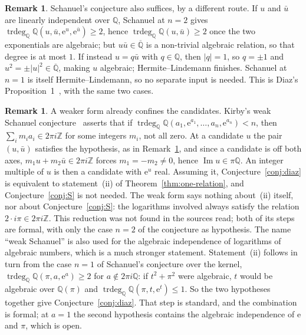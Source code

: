 \documentclass[11pt,a4paper]{article}
\theoremstyle{plain}
\theoremstyle{definition}
\newtheorem{remark}[theorem]{Remark}
\newcommand{\e}{\mathrm{e}}
\newcommand{\Q}{\mathbb{Q}}
\newcommand{\Z}{\mathbb{Z}}
\newcommand{\Alg}{\overline{\mathbb{Q}}}
\DeclareMathOperator{\trdeg}{trdeg}
\begin{document}
\begin{remark}\label{rem:schanuel}
Schanuel's conjecture also suffices, by a different route. If $u$ and $\bar u$ are linearly
independent over $\Q$, Schanuel at $n=2$ gives
$\trdeg_{\Q}\Q(u,\bar u,\e^{u},\e^{\bar u})\geq2$, hence $\trdeg_{\Q}\Q(u,\bar u)\geq2$ once
the two exponentials are algebraic; but $u\bar u\in\Alg$ is a non-trivial algebraic relation, so
that degree is at most $1$. If instead $u=q\bar u$ with $q\in\Q$, then $\lvert q\rvert=1$, so
$q=\pm1$ and $u^{2}=\pm\lvert u\rvert^{2}\in\Alg$, making $u$ algebraic; Hermite--Lindemann
finishes. Schanuel at $n=1$ is itself Hermite--Lindemann, so no separate input is needed. This is
Diaz's Proposition~1~\cite[pp.~550--551]{diaz-2004}, with the same two cases.
\end{remark}

\begin{remark}\label{rem:weak-schanuel}
A weaker form already confines the candidates. Kirby's weak Schanuel conjecture~\cite[Conjecture~1.5]{kirby-2018}
asserts that if $\trdeg_{\Q}\Q(a_{1},\e^{a_{1}},\dots,a_{n},\e^{a_{n}})<n$, then $\sum_{i}m_{i}a_{i}\in2\pi i\Z$ for
some integers $m_{i}$, not all zero. At a candidate $u$ the pair $(u,\bar u)$ satisfies the hypothesis, as in
Remark~\ref{rem:schanuel}, and since a candidate is off both axes, $m_{1}u+m_{2}\bar u\in2\pi i\Z$ forces
$m_{1}=-m_{2}\neq0$, hence $\operatorname{Im}u\in\pi\Q$. An integer multiple of $u$ is then a candidate with
$\e^{u}$ real. Assuming it, Conjecture~\ref{conj:diaz} is equivalent to statement~(ii) of
Theorem~\ref{thm:one-relation}, and Conjecture~\ref{conj:S} is not needed. The weak form says nothing about~(ii)
itself, nor about Conjecture~\ref{conj:S}: the logarithms involved always satisfy the relation
$2\cdot i\pi\in2\pi i\Z$. This reduction was not found in the sources read; both of its steps are formal, with
only the case $n=2$ of the conjecture as hypothesis. The name ``weak Schanuel'' is also used
for the algebraic independence of logarithms of algebraic numbers, which is a much stronger statement.
Statement~(ii) follows in turn from the case $n=1$ of Schanuel's conjecture over the kernel,
$\trdeg_{\Q}\Q(\pi,a,\e^{a})\geq2$ for $a\notin2\pi i\Q$: if $t^{2}+\pi^{2}$ were algebraic, $t$ would be
algebraic over $\Q(\pi)$ and $\trdeg_{\Q}\Q(\pi,t,\e^{t})\leq1$. So the two hypotheses together give
Conjecture~\ref{conj:diaz}. That step is standard, and the combination is formal; at $a=1$ the second hypothesis
contains the algebraic independence of $\e$ and $\pi$, which is open.
\end{remark}
\end{document}
